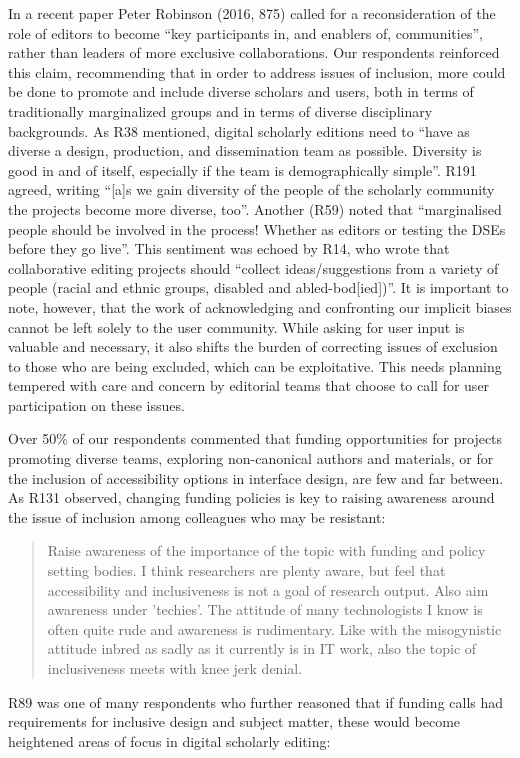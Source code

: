 \begin{paper}
In a recent paper Peter Robinson (2016, 875) called for a
reconsideration of the role of editors to become ``key participants in,
and enablers of, communities'', rather than leaders of more exclusive
collaborations. Our respondents reinforced this claim, recommending that
in order to address issues of inclusion, more could be done to promote
and include diverse scholars and users, both in terms of traditionally
marginalized groups and in terms of diverse disciplinary backgrounds. As
R38 mentioned, digital scholarly editions need to ``have as diverse a
design, production, and dissemination team as possible. Diversity is
good in and of itself, especially if the team is demographically
simple''. R191 agreed, writing ``{[}a{]}s we gain diversity of the
people of the scholarly community the projects become more diverse,
too''. Another (R59) noted that ``marginalised people should be involved
in the process! Whether as editors or testing the DSEs before they go
live''. This sentiment was echoed by R14, who wrote that collaborative
editing projects should ``collect ideas/suggestions from a variety of
people (racial and ethnic groups, disabled and abled-bod{[}ied{]})''. It
is important to note, however, that the work of acknowledging and
confronting our implicit biases cannot be left solely to the user
community. While asking for user input is valuable and necessary, it
also shifts the burden of correcting issues of exclusion to those who
are being excluded, which can be exploitative. This needs planning
tempered with care and concern by editorial teams that choose to call
for user participation on these issues.

Over 50\% of our respondents commented that funding opportunities for
projects promoting diverse teams, exploring non-canonical authors and
materials, or for the inclusion of accessibility options in interface
design, are few and far between. As R131 observed, changing funding
policies is key to raising awareness around the issue of inclusion among
colleagues who may be resistant:

\begin{quote}
Raise awareness of the importance of the topic with funding and policy
setting bodies. I think researchers are plenty aware, but feel that
accessibility and inclusiveness is not a goal of research output. Also
aim awareness under 'techies'. The attitude of many technologists I know
is often quite rude and awareness is rudimentary. Like with the
misogynistic attitude inbred as sadly as it currently is in IT work,
also the topic of inclusiveness meets with knee jerk denial.
\end{quote}
R89 was one of many respondents who further reasoned that if funding
calls had requirements for inclusive design and subject matter, these
would become heightened areas of focus in digital scholarly editing:


\end{paper}
